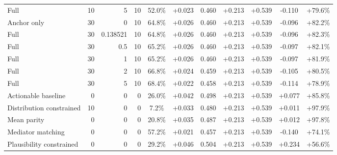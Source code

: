 \begin{table}[htbp]
\begin{tabular}{lrrrccccccc}
Full & 10 & 5 & 10 & 52.0\% & +0.023 & 0.460 & +0.213 & +0.539 & -0.110 & +79.6\% \\
Anchor only & 30 & 0 & 10 & 64.8\% & +0.026 & 0.460 & +0.213 & +0.539 & -0.096 & +82.2\% \\
Full & 30 & 0.138521 & 10 & 64.8\% & +0.026 & 0.460 & +0.213 & +0.539 & -0.096 & +82.3\% \\
Full & 30 & 0.5 & 10 & 65.2\% & +0.026 & 0.460 & +0.213 & +0.539 & -0.097 & +82.1\% \\
Full & 30 & 1 & 10 & 65.2\% & +0.026 & 0.460 & +0.213 & +0.539 & -0.097 & +81.9\% \\
Full & 30 & 2 & 10 & 66.8\% & +0.024 & 0.459 & +0.213 & +0.539 & -0.105 & +80.5\% \\
Full & 30 & 5 & 10 & 68.4\% & +0.022 & 0.458 & +0.213 & +0.539 & -0.114 & +78.9\% \\
Actionable baseline & 0 & 0 & 0 & 26.0\% & +0.042 & 0.498 & +0.213 & +0.539 & +0.077 & +85.8\% \\
Distribution constrained & 10 & 0 & 0 & 7.2\% & +0.033 & 0.480 & +0.213 & +0.539 & +0.011 & +97.9\% \\
Mean parity & 0 & 0 & 0 & 20.8\% & +0.035 & 0.487 & +0.213 & +0.539 & +0.012 & +97.8\% \\
Mediator matching & 0 & 0 & 0 & 57.2\% & +0.021 & 0.457 & +0.213 & +0.539 & -0.140 & +74.1\% \\
Plausibility constrained & 0 & 0 & 0 & 29.2\% & +0.046 & 0.504 & +0.213 & +0.539 & +0.234 & +56.6\% \\
\bottomrule
\end{tabular}
\end{table}